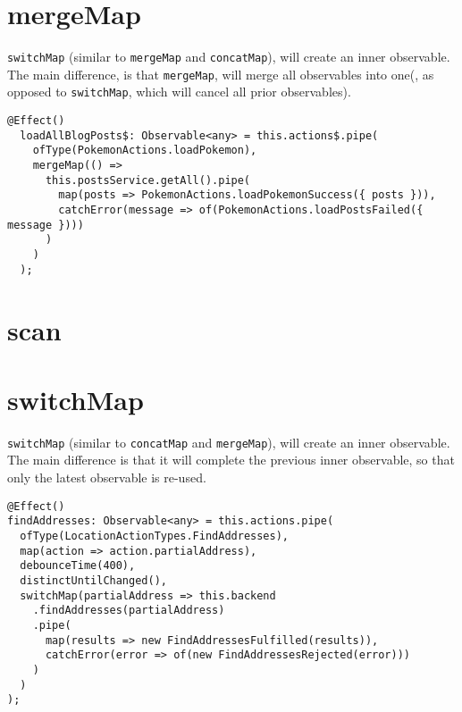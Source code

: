\section{mergeMap}
\lstinline{switchMap} (similar to \lstinline{mergeMap} and \lstinline{concatMap}),
will create an inner observable. The main difference, is that \lstinline{mergeMap},
will merge all observables into one(, as opposed to \lstinline{switchMap}, 
which will cancel all prior observables). 

\begin{lstlisting}[caption=mergeMap example]
  @Effect()
  loadAllBlogPosts$: Observable<any> = this.actions$.pipe(
    ofType(PokemonActions.loadPokemon),
    mergeMap(() =>
      this.postsService.getAll().pipe(
        map(posts => PokemonActions.loadPokemonSuccess({ posts })),
        catchError(message => of(PokemonActions.loadPostsFailed({ message })))
      )
    )
  );  
\end{lstlisting}

\section{scan}

\section{switchMap}
\lstinline{switchMap} (similar to \lstinline{concatMap} and \lstinline{mergeMap}),
will create an inner observable. The main difference is that it will complete 
the previous inner observable, so that only the latest observable is re-used. 

\begin{lstlisting}[caption=search-bar.component.ts]
@Effect()
findAddresses: Observable<any> = this.actions.pipe(
  ofType(LocationActionTypes.FindAddresses),
  map(action => action.partialAddress),
  debounceTime(400),
  distinctUntilChanged(),
  switchMap(partialAddress => this.backend
    .findAddresses(partialAddress)
    .pipe(
      map(results => new FindAddressesFulfilled(results)),
      catchError(error => of(new FindAddressesRejected(error)))
    )
  )
);  
\end{lstlisting}
 
